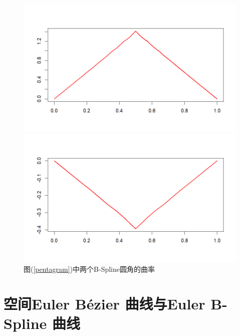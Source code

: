 \documentclass[utf8]{ctexart} %
\begin{document}
\begin{figure}
	\centering
	\begin{minipage}{0.49\linewidth}
		\centering
		\includegraphics[width=0.7\linewidth]{figures/Pentagram_B-Spline1.png}
	\end{minipage}
	\begin{minipage}{0.49\linewidth}
		\centering
		\includegraphics[width=0.7\linewidth]{figures/Pentagram_B-Spline2.png}
	\end{minipage}
\caption{\small{图(\ref{pentagram})中两个B-Spline圆角的曲率}}
\end{figure}
	 \section{空间Euler B\'{e}zier 曲线与Euler B-Spline 曲线}
\end{document}
